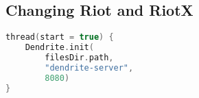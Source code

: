 \subsection{Changing Riot and RiotX}
\begin{lstfloat}
  \begin{lstlisting}[language=Kotlin, label={lst:riotx_init}, caption={
  A simple approach to embedding Dendrite in RiotX is simply to spawn a new thread with a call to the \texttt{Init} method as shown in listing \ref{lst:dendrite_init}
}]
thread(start = true) {
    Dendrite.init(
        filesDir.path,
        "dendrite-server", 
        8080)
}
\end{lstlisting}
\end{lstfloat}
